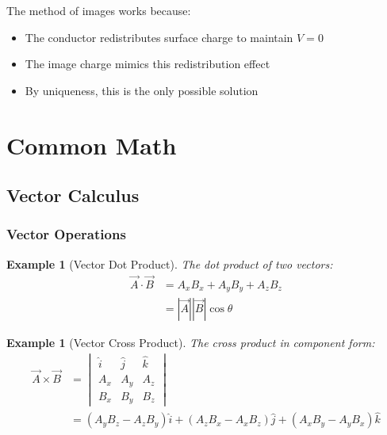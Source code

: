 \documentclass{article}
\newtheorem{example}[theorem]{Example}
\begin{document}
The method of images works because:
\begin{itemize}
    \item The conductor redistributes surface charge to maintain $V = 0$
    \item The image charge mimics this redistribution effect
    \item By uniqueness, this is the only possible solution
\end{itemize}


\newpage
\section{Common Math}
\subsubsection*{}

\subsection{Vector Calculus}

\subsubsection{Vector Operations}
\begin{example}[Vector Dot Product]
The dot product of two vectors:
\begin{align*}
    \vec{A} \cdot \vec{B} &= A_x B_x + A_y B_y + A_z B_z \\
    &= |\vec{A}||\vec{B}|\cos\theta
\end{align*}
\end{example}

\begin{example}[Vector Cross Product]
The cross product in component form:
\begin{align*}
    \vec{A} \times \vec{B} &= \begin{vmatrix}
        \hat{i} & \hat{j} & \hat{k} \\
        A_x & A_y & A_z \\
        B_x & B_y & B_z
    \end{vmatrix} \\
    &= (A_y B_z - A_z B_y)\hat{i} + (A_z B_x - A_x B_z)\hat{j} + (A_x B_y - A_y B_x)\hat{k}
\end{align*}
\end{example}
\end{document}
